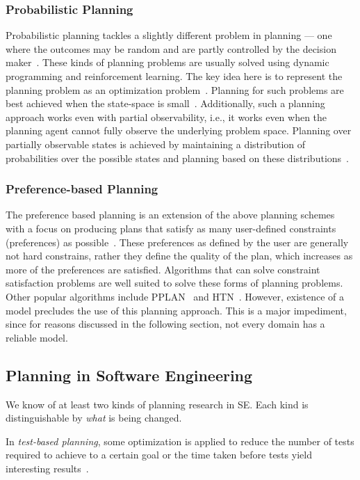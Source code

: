 \documentclass[10pt,journal,compsoc]{IEEEtran}
\begin{document}
\subsubsection{Probabilistic Planning}
\label{sect:prob_plan}
Probabilistic planning tackles a slightly different problem in planning --- one where the outcomes may be random and are partly controlled by the decision maker~\cite{Bel, altman99, guo2009}. These kinds of planning problems are usually solved using dynamic programming and reinforcement learning. The key idea here is to represent the planning problem as an optimization problem~\cite{ghallab04}. Planning for such problems are best achieved when the state-space is small~\cite{ghallab04}. Additionally, such a planning approach works even with partial observability, i.e., it works even when the planning agent cannot fully observe the underlying problem space. Planning over partially observable states is achieved by maintaining a distribution of probabilities over the possible states and planning based on these distributions~\cite{kaelbling98}.


\subsubsection{Preference-based Planning}
\label{sect:pref_plan}
The preference based planning is an extension of the above planning schemes with a focus on producing plans that satisfy as many user-defined constraints (preferences) as possible~\cite{son06}. These preferences as defined by the user are generally not hard constrains, rather they define the quality of the plan, which increases as more of the preferences are satisfied. Algorithms that can solve constraint satisfaction problems are well suited to solve these forms of planning problems. Other popular algorithms include PPLAN~\cite{son06} and HTN~\cite{baier09}. However, existence of a model precludes the use of this planning approach. This is a major impediment, since for reasons discussed in the following section, not every domain has a reliable model.

\subsection{Planning in Software Engineering}
We know of at least two kinds of planning research in SE. Each kind is distinguishable by {\em what} is being changed.

In {\em test-based planning}, some optimization is applied to reduce the number of tests required to achieve to a certain goal  or the time taken before tests yield interesting results~\cite{tallam2006concept, yoo2012regression, blue2013interaction}.

\end{document}
